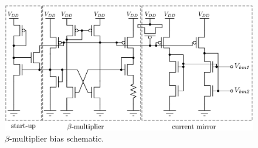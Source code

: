 \begin{figure}[!t]
	\centering
	\includegraphics[width=6in]{./Figures/Filter/bias_filter_post}
	\caption{$\beta$-multiplier bias schematic.}\label{fig:bias_filter_post}
\end{figure}






